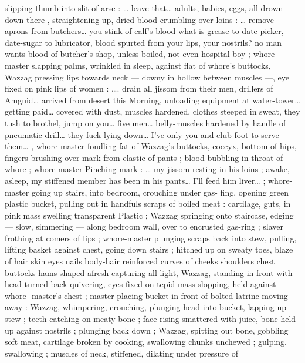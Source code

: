{slipping thumb into slit of arse : {\gl}{\ldots} leave that{\ldots} adults, babies, eggs, 
all drown down there{\td} {\gr}, straightening up, dried blood crumbling 
over loins : {\gl}{\ldots} remove aprons from butchers{\ldots} you stink of calf's 
blood{\td} what is grease to date-picker, date-sugar to lubricator, blood 
spurted from your lips, your nostrils?{\td} no man wants blood of 
butcher's shop, unless boiled,{\td} not even hospital boy {\gr} ; whore- 
master slapping palms, wrinkled in sleep, against flat of whore's 
buttocks, Wazzag pressing lips towards neck --- downy in hollow 
between muscles ---, eye fixed on pink lips of women : {\gl}{\ldots}. drain all 
jissom from their men, drillers of Amguid{\ldots} arrived from desert this 
Morning, unloading equipment at water-tower{\ldots} getting paid{\ldots} 
covered with dust, muscles hardened, clothes steeped in sweat, they 
tush to brothel, jump on you{\ldots} five men{\ldots} belly-muscles hardened by 
handle of pneumatic drill{\ldots} they fuck lying down{\ldots} I've only you and 
club-foot to serve them{\ldots} {\gr}, whore-master fondling fat of Wazzag's 
buttocks, coccyx, bottom of hips, fingers brushing over mark from 
elastic of pants ; blood bubbling in throat of whore ; whore-master 
Pinching mark : {\gl} {\ldots} my jissom resting in his loins ; awake, asleep, my 
stiffened member has been in his pants{\ldots} I'll feed him liver{\ldots} {\gr} ; 
whore-master going up stairs, into bedroom, crouching under gas- 
fing, opening green plastic bucket, pulling out in handfuls scraps of 
boiled meat : cartilage, guts, in pink mass swelling transparent 
Plastic ; Wazzag springing onto staircase, edging --- slow, simmering 
--- along bedroom wall, over to encrusted gas-ring ; slaver frothing 
at comers of lips ; whore-master plunging scraps back into stew, 
pulling, lifting basket against chest, going down stairs ; hitched up 
on sweaty toes, blaze of hair skin eyes nails body-hair reinforced 
curves of cheeks shoulders chest buttocks hams shaped afresh 
capturing all light, Wazzag, standing in front with head turned back 
quivering, eyes fixed on tepid mass slopping, held against whore- 
master's chest ; master placing bucket in front of bolted latrine 
moving away : Wazzag, whimpering, crouching, plunging head into 
bucket, lapping up stew ; teeth catching on meaty bone ; face rising 
smattered with juice, bone held up against nostrils ; plunging back 
down ; Wazzag, spitting out bone, gobbling soft meat, cartilage 
broken by cooking, swallowing chunks unchewed ; gulping. 
swallowing ; muscles of neck, stiffened, dilating under pressure of 
}
